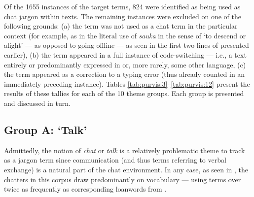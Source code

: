 \documentclass[output=paper
,newtxmath
,modfonts
,nonflat]{langsci/langscibook}
\begin{document}
Of the 1655 instances of the target terms, 824 were identified as being used as chat jargon within  texts. The remaining instances were excluded on one of the following grounds: (a) the term was not used as a chat term in the particular context (for example, as in the literal use of \textit{sauka} in the sense of ‘to descend or alight’ — as opposed to going offline — as seen in the first two lines of  presented earlier), (b) the term appeared in a full instance of code-switching — i.e., a text entirely or predominantly expressed in  or, more rarely, some other language, (c) the term appeared as a correction to a typing error (thus already counted in an immediately preceding instance). Tables \ref{tab:purvis:3}--\ref{tab:purvis:12} present the results of these tallies for each of the 10 theme groups. Each group is presented and discussed in turn.

\subsection{Group A: ‘Talk’}

Admittedly, the notion of \textit{chat} or \textit{talk} is a relatively problematic theme to track as a jargon term since communication (and thus terms referring to verbal exchange) is a natural part of the chat environment. In any case, as seen in , the  chatters in this corpus draw predominantly on  vocabulary — using  terms over twice as frequently as corresponding loanwords from .
\end{document}
